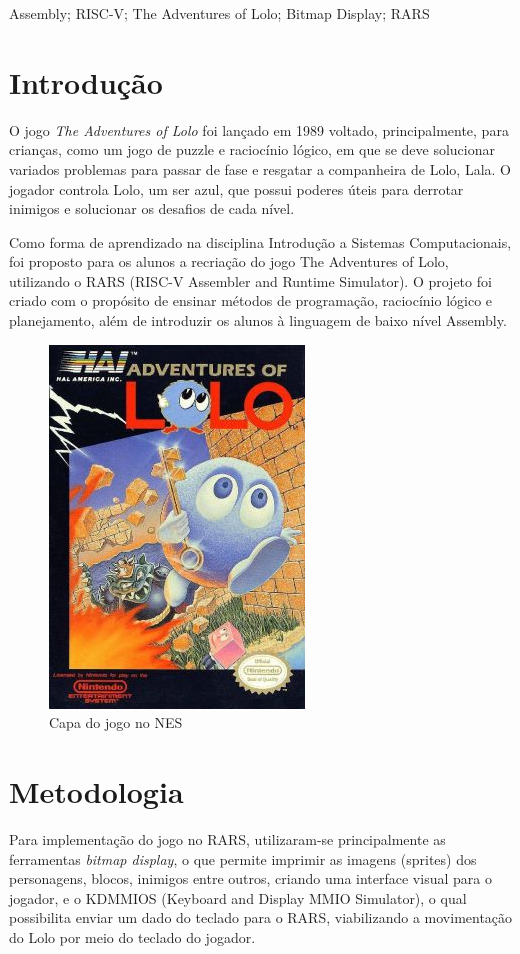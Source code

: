 \documentclass[10pt, conference, compsocconf]{IEEEtran}
\begin{document}
\begin{IEEEkeywords}
Assembly; RISC-V; The Adventures of Lolo; Bitmap Display; RARS
\end{IEEEkeywords}


\section{Introdução}
O jogo \textit{The Adventures of Lolo} foi lançado em 1989 voltado,
principalmente, para crianças, como um jogo de puzzle e raciocínio lógico, em
que se deve solucionar variados problemas para passar de fase e resgatar a
companheira de Lolo, Lala. O jogador controla Lolo, um ser azul, que possui
poderes úteis para derrotar inimigos e solucionar os desafios de cada nível.

Como forma de aprendizado na disciplina Introdução a Sistemas Computacionais,
foi proposto para os alunos a recriação do jogo The Adventures of Lolo,
utilizando o RARS (RISC-V Assembler and Runtime Simulator). O projeto foi criado
com o propósito de ensinar métodos de programação, raciocínio lógico e
planejamento, além de introduzir os alunos à linguagem de baixo nível Assembly.

\begin{figure}[htb]
  \begin{center}
   \includegraphics[width=0.3\linewidth]{./Figures/image_1.png}
  \end{center}
  \caption{Capa do jogo no NES}
  \label{fig:01}
\end{figure}

\section{Metodologia}
\label{sec:Metodologia}

Para implementação do jogo no RARS, utilizaram-se principalmente as ferramentas
\textit{bitmap display}, o que permite imprimir as imagens (sprites) dos personagens,
blocos, inimigos entre outros, criando uma interface visual para o jogador, e o
KDMMIOS (Keyboard and Display MMIO Simulator), o qual possibilita enviar um dado
do teclado para o RARS, viabilizando a movimentação do Lolo por meio do teclado
do jogador.
\end{document}
